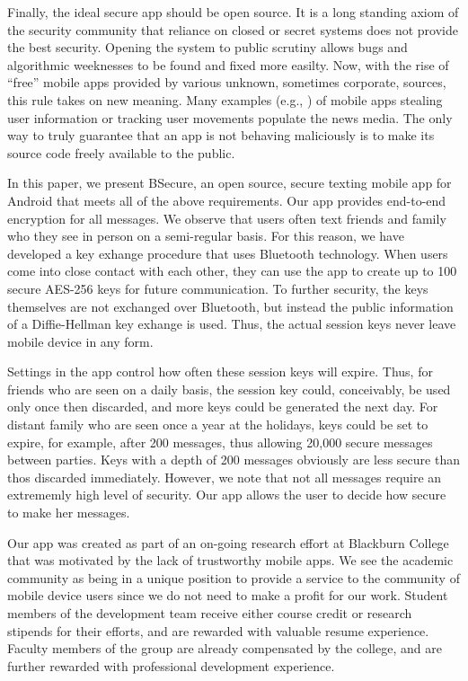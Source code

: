 Finally, the ideal secure app should be open source. It is a long standing axiom of the
security community \cite{Kerckhoffs:1883:CMF,shannon-otp} that reliance on closed or secret systems
does not provide the best security. Opening the system to public scrutiny allows bugs and
algorithmic weeknesses to be found and fixed more easilty. Now, with the rise of ``free'' mobile
apps provided by various unknown, sometimes corporate, sources, this rule takes on new meaning.
Many examples (e.g., \cite{flashlight}) of mobile apps stealing user information or tracking
user movements populate the news media. The only way to truly guarantee that an app is not
behaving maliciously is to make its source code freely available to the public.

In this paper, we present BSecure, an open source, secure texting mobile app for Android that
meets all of the above requirements. Our app provides end-to-end encryption for all messages.
We observe that users often text friends and family who they see in person on a semi-regular basis.
For this reason, we have developed a key exhange procedure that uses Bluetooth technology. When
users come into close contact with each other, they can use the app to create up to 100 secure
AES-256 keys for future communication. To further security, the keys themselves are not exchanged
over Bluetooth, but instead the public information of a Diffie-Hellman key exhange is used. Thus,
the actual session keys never leave mobile device in any form.

Settings in the app control how often these session keys will expire. Thus, for friends who are
seen on a daily basis, the session key could, conceivably, be used only once then discarded,
and more keys could be generated the next day. For distant family who are seen once a year
at the holidays, keys could be set to expire, for example, after 200 messages, thus allowing
20,000 secure messages between parties. Keys with a depth of 200 messages obviously are
less secure than thos discarded immediately. However, we note that not all messages require
an extrememly high level of security. Our app allows the user to decide how secure to make
her messages.

Our app was created as part of an on-going research effort at Blackburn College that was
motivated by the lack of trustworthy mobile apps. We see the academic community as being in a
unique position to provide a service to the community of mobile device users since we do not
need to make a profit for our work. Student members of the development team receive either course
credit or research stipends for their efforts, and are rewarded with valuable resume experience.
Faculty members of the group are already compensated by the college, and are further rewarded
with professional development experience.

